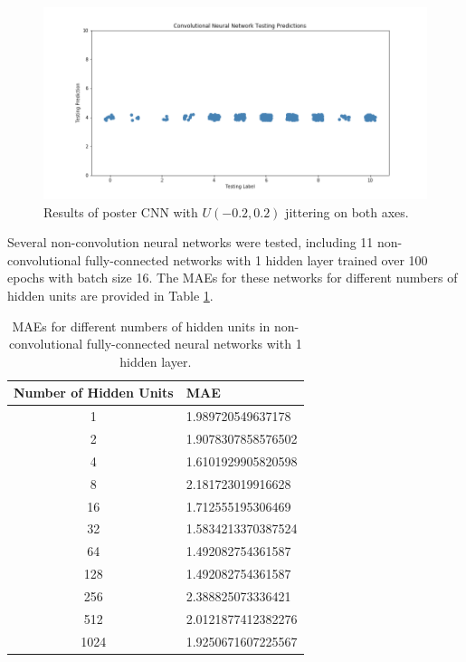 \documentclass[12pt, oneside]{article}   	%
\begin{document}
\begin{figure}%
\includegraphics[width=\textwidth]{cnn_all_fours}
\caption{\label{fig:cnn_all_fours}Results of poster CNN with $U(-0.2, 0.2)$ jittering on both axes.}
\end{figure}

Several non-convolution neural networks were tested, including 11 non-convolutional fully-connected networks with 1 hidden layer trained over 100 epochs with batch size 16. The MAEs for these networks for different numbers of hidden units are provided in Table \ref{table:fcnn_maes}.

\begin{table}
\begin{center}\begin{tabular}{c|l}
\textbf{Number of Hidden Units} & \textbf{MAE} \\ \hline
1 & 1.989720549637178 \\
2 & 1.9078307858576502 \\
4 & 1.6101929905820598 \\
8 & 2.181723019916628 \\
16 & 1.712555195306469 \\
32 & 1.5834213370387524 \\
64 & 1.492082754361587 \\
128 & 1.492082754361587 \\
256 & 2.388825073336421 \\
512 & 2.0121877412382276 \\
1024 & 1.9250671607225567 \\
\end{tabular}\end{center}
\caption{\label{table:fcnn_maes}MAEs for different numbers of hidden units in non-convolutional fully-connected neural networks with 1 hidden layer.}
\end{table} 
\end{document}
